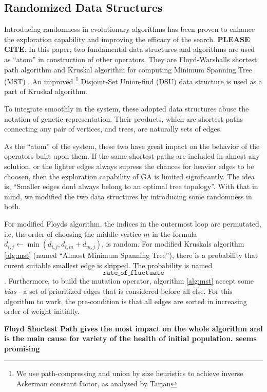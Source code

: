 \documentclass[runningheads]{llncs}
\begin{document}
\subsection{Randomized Data Structures}
Introducing randomness in evolutionary algorithms has been proven to enhance the exploration capability and improving the efficacy of the search. \textbf{PLEASE CITE}. In this paper, two fundamental data structures and algorithms are used as ``atom'' in construction of other operators. They are Floyd-Warshall\textquotesingle s shortest path algorithm \cite{floyd1962algorithm} and Kruskal algorithm for computing Minimum Spanning Tree (MST) \cite{kruskal1956shortest}. An improved \footnote{We use path-compressing and union by size heuristics to achieve inverse Ackerman constant factor, as analysed by Tarjan} Disjoint-Set Union-find (DSU) data structure \cite{tarjan1975efficiency} is used as a part of Kruskal algorithm.

To integrate smoothly in the system, these adopted data structures abuse the notation of genetic representation. Their products, which are shortest paths connecting any pair of vertices, and trees, are naturally sets of edges.

As the ``atom'' of the system, these two have great impact on the behavior of the operators built upon them. If the same shortest paths are included in almost any solution, or the lighter edges always supress the chances for heavier edges to be choosen, then the exploration capability of GA is limited significantly. The idea is, ``Smaller edges don\'t always belong to an optimal tree topology''. With that in mind, we modified the two data structures by introducing some randomness in both. 

For modified Floyd\textquotesingle s algorithm, the indices in the outermost loop are permutated, i.e, the order of choosing the middle vertice $m$ in the formula $d_{i,j} \gets \min(d_{i,j}, d_{i,m} + d_{m,j})$, is random. For modified Kruskal\textquotesingle s algorithm \ref{alg:mst} (named ``Almost Minimum Spanning Tree''), there is a probability that curent suitable smallest edge is skipped. The probability is named $$\texttt{rate\_of\_fluctuate}$$. Furthermore, to build the mutation operator, algorithm \ref{alg:mst} accept some \textit{bias} - a set of prioritized edges that is considered before all else. For this algorithm to work, the pre-condition is that all edges are sorted in increasing order of weight initially.

\textbf{Floyd Shortest Path gives the most impact on the whole algorithm and is the main cause for variety of the health of initial population. \cite{haouari2006hybrid} seems promising}
\end{document}
